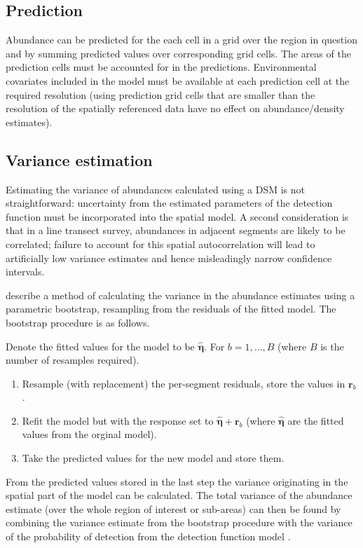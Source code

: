 \documentclass[a4paper,12pt]{article}
\begin{document}
\subsection*{Prediction}

Abundance can be predicted for the each cell in a grid over the region in question and by summing predicted values over corresponding grid cells. The areas of the prediction cells must be accounted for in the predictions. Environmental covariates included in the model must be available at each prediction cell at the required resolution (using prediction grid cells that are smaller than the resolution of the spatially referenced data have no effect on abundance/density estimates).  

\subsection*{Variance estimation}

Estimating the variance of abundances calculated using a DSM is not straightforward: uncertainty from the estimated parameters of the detection function must be incorporated into the spatial model. A second consideration is that in a line transect survey, abundances in adjacent segments are likely to be correlated; failure to account for this spatial autocorrelation will lead to artificially low variance estimates and hence misleadingly narrow confidence intervals.

\cite{Hedley:2004et} describe a method of calculating the variance in the abundance estimates using a parametric bootstrap, resampling from the residuals of the fitted model. The bootstrap procedure is as follows.

Denote the fitted values for the model to be $\hat{\bm{\eta}}$. For $b=1,\ldots,B$ (where $B$ is the number of resamples required).
\begin{enumerate}
	\item Resample (with replacement) the per-segment residuals, store the values in $\mathbf{r}_{b}$.
	\item Refit the model but with the response set to $\hat{\bm{\eta}}+\mathbf{r}_{b}$ (where $\hat{\bm{\eta}}$ are the fitted values from the orginal model).
	\item Take the predicted values for the new model and store them.
\end{enumerate}
From the predicted values stored in the last step the variance originating in the spatial part of the model can be calculated. The total variance of the abundance estimate (over the whole region of interest or sub-areas) can then be found by combining the variance estimate from the bootstrap procedure with the variance of the probability of detection from the detection function model \citep[using the delta method which assumes that the two components of the variance are independent;][]{Seber:2002ti}.
\end{document}
